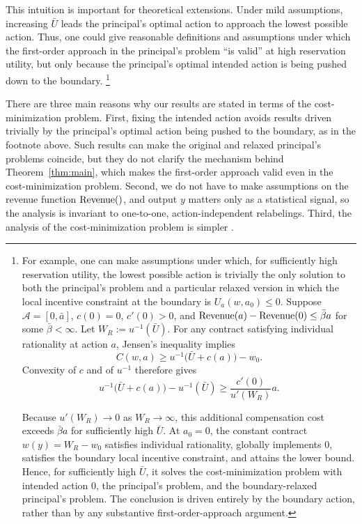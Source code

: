 This intuition is important for theoretical extensions. Under mild assumptions, increasing $\bar U$ leads the principal's optimal action to approach the lowest possible action. Thus, one could give reasonable definitions and assumptions under which the first-order approach in the principal's problem ``is valid'' at high reservation utility, but only because the principal's optimal intended action is being pushed down to the boundary.%
\footnote{For example, one can make assumptions under which, for sufficiently high reservation utility, the lowest possible action is trivially the only solution to both the principal's problem and a particular relaxed version in which the local incentive constraint at the boundary is $U_a(w,a_0)\leq0$. Suppose $\mathcal A=[0,\bar a]$, $c(0)=0$, $c'(0)>0$, and $\operatorname{Revenue}(a)-\operatorname{Revenue}(0)\leq \bar\beta a$ for some $\bar\beta<\infty$. Let $W_R:=u^{-1}(\bar U)$. For any contract satisfying individual rationality at action $a$, Jensen's inequality implies
\[
 C(w,a)\geq u^{-1}\bigl(\bar U+c(a)\bigr)-w_0.
\]
Convexity of $c$ and of $u^{-1}$ therefore gives
\[
 u^{-1}\bigl(\bar U+c(a)\bigr)-u^{-1}(\bar U)
 \geq \frac{c'(0)}{u'(W_R)}a.
\]

Because $u'(W_R)\to0$ as $W_R\to\infty$, this additional compensation cost exceeds $\bar\beta a$ for sufficiently high $\bar U$. At $a_0=0$, the constant contract $w(y)=W_R-w_0$ satisfies individual rationality, globally implements $0$, satisfies the boundary local incentive constraint, and attains the lower bound. Hence, for sufficiently high $\bar U$, it solves the cost-minimization problem with intended action $0$, the principal's problem, and the boundary-relaxed principal's problem. The conclusion is driven entirely by the boundary action, rather than by any substantive first-order-approach argument.}

There are three main reasons why our results are stated in terms of the cost-minimization problem. First, fixing the intended action avoids results driven trivially by the principal's optimal action being pushed to the boundary, as in the footnote above. Such results can make the original and relaxed principal's problems coincide, but they do not clarify the mechanism behind Theorem~\ref{thm:main}, which makes the first-order approach valid even in the cost-minimization problem. Second, we do not have to make assumptions on the revenue function $\operatorname{Revenue} ()$, and output $y$ matters only as a statistical signal, so the analysis is invariant to one-to-one, action-independent relabelings. Third, the analysis of the cost-minimization problem is simpler \textcite{grossman1983}.

